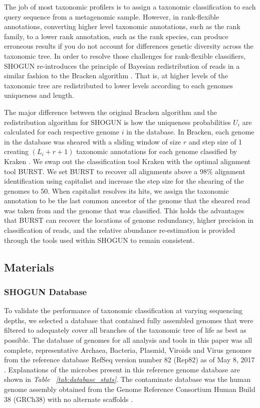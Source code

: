 The job of most taxonomic profilers is to assign a taxonomic classification to each query sequence from a metagenomic sample. However, in rank-flexible annotations, converting higher level taxonomic annotations, such as the rank family, to a lower rank annotation, such as the rank species, can produce erroneous results if you do not account for differences genetic diversity across the taxonomic tree. In order to resolve those challenges for rank-flexible classifiers, SHOGUN re-introduces the principle of Bayesian redistribution of reads in a similar fashion to the Bracken algorithm \cite{lu_bracken:_2017}. That is, at higher levels of the taxonomic tree are redistributed to lower levels according to each genomes uniqueness and length.

The major difference between the original Bracken algorithm and the redistribution algorithm for SHOGUN is how the uniqueness probabilities $U_i$ are calculated for each respective genome $i$ in the database. In Bracken, each genome in the database was sheared with a sliding window of size $r$ and step size of 1 creating $(L_i + r + 1)$ taxonomic annotations for each genome classified by Kraken \cite{wood_kraken:_2014}. We swap out the classification tool Kraken with the optimal alignment tool BURST. We set BURST to recover all alignments above a 98\% alignment identification using capitalist and increase the step size for the shearing of the genomes to 50. When capitalist resolves its hits, we assign the taxonomic annotation to be the last common ancestor of the genome that the sheared read was taken from and the genome that was classified. This holds the advantages that BURST can recover the locations of genome redundancy, higher precision in classification of reads, and the relative abundance re-estimation is provided through the tools used within SHOGUN to remain consistent.

\subsection{Materials}

\subsubsection{SHOGUN Database}

To validate the performance of taxonomic classification at varying sequencing depths, we selected a database that contained fully assembled genomes that were filtered to adequately cover all branches of the taxonomic tree of life as best as possible. The database of genomes for all analysis and tools in this paper was all complete, representative Archaea, Bacteria, Plasmid, Viroids and Virus genomes from the reference database RefSeq version number 82 (Rep82) as of May 8, 2017 \cite{tatusova_refseq_2014}. Explanations of the microbes present in this reference genome database are shown in \textit{Table ~\ref{tab:database_stats}}. The contaminate database was the human genome assembly obtained from the Genome Reference Consortium Human Build 38 (GRCh38) with no alternate scaffolds \cite{staff_introducing_2013}.

